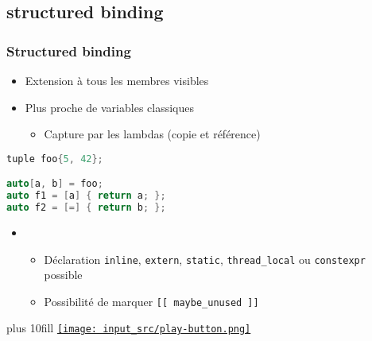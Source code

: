 \documentclass[C++.tex]{subfiles}
\begin{document}
\subsection*{structured binding}
\begin{frame}[fragile]
	\frametitle{Structured binding}
	\begin{itemize}
		\item Extension à tous les membres visibles


		\item Plus proche de variables classiques
		\begin{itemize}
			\item Capture par les lambdas (copie et référence)
		\end{itemize}
	\end{itemize}


	\begin{lstlisting}[language=C++]
tuple foo{5, 42};

auto[a, b] = foo;
auto f1 = [a] { return a; };
auto f2 = [=] { return b; };\end{lstlisting}

	\begin{itemize}
		\item [] \begin{itemize}
			\item Déclaration \lstinline|inline|, \lstinline|extern|, \lstinline|static|, \lstinline|thread_local| ou \lstinline|constexpr| possible
			\item Possibilité de marquer \lstinline|[[ maybe_unused ]]|
		\end{itemize}
	\end{itemize}

	\vskip 10mm plus 10fill
	\hfill
	\href{https://godbolt.org/#g:!((g:!((g:!((h:codeEditor,i:(filename:'1',fontScale:14,fontUsePx:'0',j:1,lang:c%2B%2B,selection:(endColumn:1,endLineNumber:15,positionColumn:1,positionLineNumber:15,selectionStartColumn:1,selectionStartLineNumber:1,startColumn:1,startLineNumber:1),source:'%23include+%3Ciostream%3E%0A%23include+%3Ctuple%3E%0A%0Aint+main()%0A%7B%0A++std::tuple+foo%7B5,+42%7D%3B%0A%0A++auto%5Ba,+b%5D+%3D+foo%3B%0A++auto+f1+%3D+%5Ba%5D+%7B+return+a%3B+%7D%3B%0A++auto+f2+%3D+%5B%3D%5D+%7B+return+b%3B+%7D%3B%0A%0A++std::cout+%3C%3C+f1()+%3C%3C+%22%5Cn%22%3B%0A++std::cout+%3C%3C+f2()+%3C%3C+%22%5Cn%22%3B%0A%7D%0A'),l:'5',n:'0',o:'C%2B%2B+source+%231',t:'0')),k:50,l:'4',n:'0',o:'',s:0,t:'0'),(g:!((h:executor,i:(argsPanelShown:'1',compilationPanelShown:'0',compiler:g122,compilerName:'',compilerOutShown:'0',execArgs:'',execStdin:'',fontScale:14,fontUsePx:'0',j:1,lang:c%2B%2B,libs:!((name:boost,ver:'175')),options:'-std%3Dc%2B%2B20+-Wall+-Wextra+-pedantic',source:1,stdinPanelShown:'1',tree:'1',wrap:'0'),l:'5',n:'0',o:'Executor+x86-64+gcc+12.2+(C%2B%2B,+Editor+%231)',t:'0')),header:(),k:50,l:'4',n:'0',o:'',s:0,t:'0')),l:'2',n:'0',o:'',t:'0')),version:4}{\texttt{[image: input\_src/play-button.png]}}
\end{frame}
\end{document}
